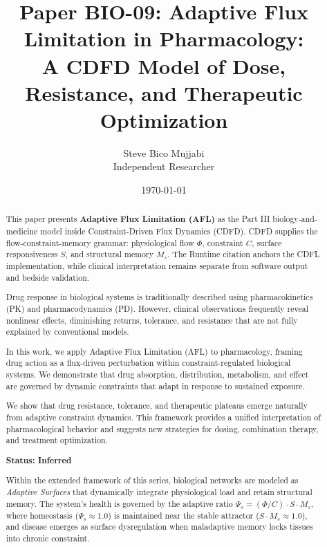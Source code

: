 \documentclass[11pt]{article}
\title{\textbf{Paper BIO-09: Adaptive Flux Limitation in Pharmacology:\\ A CDFD Model of Dose, Resistance, and Therapeutic Optimization}}
\author{Steve Bico Mujjabi\\ \small Independent Researcher}
\date{\today}
\begin{document}
\maketitle

\begin{abstract}

This paper presents \textbf{Adaptive Flux Limitation (AFL)} as the Part III biology-and-medicine model inside Constraint-Driven Flux Dynamics (CDFD). CDFD supplies the flow-constraint-memory grammar: physiological flow $\Phi$, constraint $C$, surface responsiveness $S$, and structural memory $M_s$. The Runtime citation anchors the CDFL implementation, while clinical interpretation remains separate from software output and bedside validation.


Drug response in biological systems is traditionally described using pharmacokinetics (PK) and pharmacodynamics (PD). However, clinical observations frequently reveal nonlinear effects, diminishing returns, tolerance, and resistance that are not fully explained by conventional models.

In this work, we apply Adaptive Flux Limitation (AFL) to pharmacology, framing drug action as a flux-driven perturbation within constraint-regulated biological systems. We demonstrate that drug absorption, distribution, metabolism, and effect are governed by dynamic constraints that adapt in response to sustained exposure.

We show that drug resistance, tolerance, and therapeutic plateaus emerge naturally from adaptive constraint dynamics. This framework provides a unified interpretation of pharmacological behavior and suggests new strategies for dosing, combination therapy, and treatment optimization.

\textbf{Status: Inferred}

\medskip
\noindent Within the extended framework of this series, biological networks are modeled as \emph{Adaptive Surfaces} that dynamically integrate physiological load and retain structural memory. The system's health is governed by the adaptive ratio $\Psi_s = (\Phi/C) \cdot S \cdot M_s$, where homeostasis ($\Psi_s \approx 1.0$) is maintained near the stable attractor ($S \cdot M_s \approx 1.0$), and disease emerges as surface dysregulation when maladaptive memory locks tissues into chronic constraint.

\end{abstract}
\end{document}
